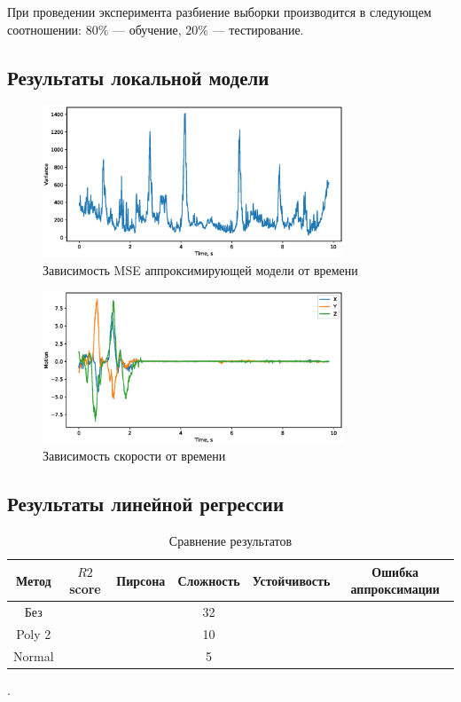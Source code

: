 \documentclass[12pt, twoside]{article}
\begin{document}
При проведении эксперимента разбиение выборки производится в следующем соотношении: $80\%$ --- обучение, $20\%$ --- тестирование.
\subsection{Результаты локальной модели}

\begin{figure}[h!]
	\centering
	\includegraphics[width=0.8\textwidth]{../figs/variance.eps}
	\caption{Зависимость MSE аппроксимирующей модели от времени}
\end{figure}

\begin{figure}[h!]
	\centering
	\includegraphics[width=0.8\textwidth]{../figs/motion.eps}
	\caption{Зависимость скорости от времени}
\end{figure}

\subsection{Результаты линейной регрессии}

\begin{table}[h!]
	\centering
	\begin{tabular}{|c|c|c|c|c|c|}
		\hline
		Метод & $R2$ score &  Пирсона & Сложность & Устойчивость & Ошибка аппроксимации \\ \hline
	Без & & & 32 & & \\ \hline
	Poly 2 & & & 10 & &\\ \hline
	Normal & & & 5 & &\\ \hline
	\end{tabular}
	\caption{Сравнение результатов}
\end{table}


\newpage
.
\newpage


\end{document}
